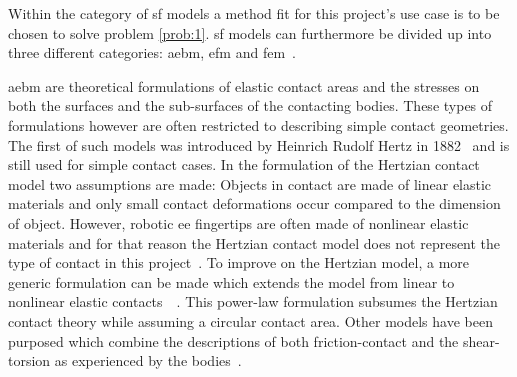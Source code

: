 Within the category of \gls{sf} models a method fit for this project's use case is to be chosen to solve problem \ref{prob:1}. \gls{sf} models can furthermore be divided up into three different categories: \gls{aebm}, \gls{efm} and \gls{fem}~\cite{a-modified-elastic-foundation-contact-model-for-application-in-3d-models-of-the-prosthetic-knee}. \medskip

\gls{aebm} are theoretical formulations of elastic contact areas and the stresses on both the surfaces and the sub-surfaces of the contacting bodies. These types of formulations however are often restricted to describing simple contact geometries. The first of such models was introduced by Heinrich Rudolf Hertz in 1882~\cite{on-the-contact-of-rigid-elastic-solids-and-on-hardness} and is still used for simple contact cases. In the formulation of the Hertzian contact model two assumptions are made: Objects in contact are made of linear elastic materials and only small contact deformations occur compared to the dimension of object. However, robotic \gls{ee} fingertips are often made of nonlinear elastic materials and for that reason the Hertzian contact model does not represent the type of contact in this project~\cite[Chapter 37]{handbook-of-robotics}. To improve on the Hertzian model, a more generic formulation can be made which extends the model from linear to nonlinear elastic contacts~\cite{modeling-of-contact-mechanics-and-friction-limit-surfaces-for-soft-fingers-in-robotics-with-experimental-results}~\cite{the-haptic-and-perceptional-characteristics-of-an-anthropomorphic-curved-soft-finger-structure}. This power-law formulation subsumes the Hertzian contact theory while assuming a circular contact area. Other models have been purposed which combine the descriptions of both friction-contact and the shear-torsion as experienced by the bodies~\cite{the-sliding-of-robot-fingers-under-combined-torsion-and-shear-loading}. \medskip


